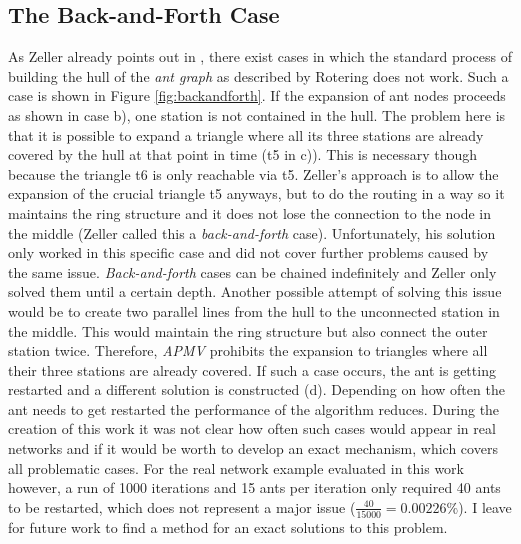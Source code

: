 \subsection{The Back-and-Forth Case}\label{backandforth}
As Zeller already points out in \cite{zeller2021planung}, there exist cases in which the standard process of building the hull  of the \textit{ant graph} as described by Rotering does not work. Such a case is shown in Figure \ref{fig:backandforth}.
If the expansion of ant nodes proceeds as shown in case b), one station is not contained in the hull. The problem here is that it is possible to expand a triangle where all its three stations are already covered by the hull at that point in time (t5 in c)). This is necessary though because the triangle t6 is only reachable via t5. Zeller's approach is to allow the expansion of the crucial triangle t5 anyways, but to do the routing in a way so it maintains the ring structure and it does not lose the connection to the node in the middle (Zeller called this a \textit{back-and-forth} case). Unfortunately, his solution only worked in this specific case and did not cover further problems caused by the same issue. \textit{Back-and-forth} cases can be chained indefinitely and Zeller only solved them until a certain depth. Another possible attempt of solving this issue would be to create two parallel lines from the hull to the unconnected station in the middle. This would maintain the ring structure but also connect the outer station twice. Therefore, \textit{APMV} prohibits the expansion to triangles where all their three stations are already covered. If such a case occurs, the ant is getting restarted and a different solution is constructed (d). Depending on how often the ant needs to get restarted the performance of the algorithm reduces. During the creation of this work it was not clear how often such cases would appear in real networks and if it would be worth to develop an exact mechanism, which covers all problematic cases. For the real network example evaluated in this work however, a run of 1000 iterations and 15 ants per iteration only required 40 ants to be restarted, which does not represent a major issue ($\frac{40}{15000} = 0.00226 \%$). I leave for future work to find a method for an exact solutions to this problem.

